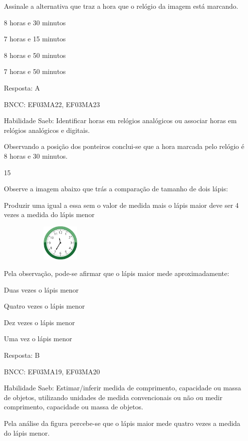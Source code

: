 \begin{escolha}
{\begin{escolha}
{Assinale a alternativa que traz a hora que o relógio da imagem está
marcando.

\begin{escolha}
\item
  8 horas e 30 minutos
\item
  7 horas e 15 minutos
\item
  8 horas e 50 minutos
\item
  7 horas e 50 minutos
\end{escolha}

Resposta: A

BNCC: EF03MA22, EF03MA23

Habilidade Saeb: Identificar horas em relógios analógicos ou associar
horas em relógios analógicos e digitais.

Observando a posição dos ponteiros conclui-se que a hora marcada pelo
relógio é 8 horas e 30 minutos.

\num{15}

Observe a imagem abaixo que trás a comparação de tamanho de dois lápis:

Produzir uma igual a essa sem o valor de medida mais o lápis maior deve
ser 4 vezes a medida do lápis menor

\includegraphics[width=2.43137in,height=0.71356in]{media/image116.png}

Pela observação, pode-se afirmar que o lápis maior mede aproximadamente:

\begin{escolha}
\item
  Duas vezes o lápis menor
\item
  Quatro vezes o lápis menor
\item
  Dez vezes o lápis menor
\item
  Uma vez o lápis menor
\end{escolha}

Resposta: B

BNCC: EF03MA19, EF03MA20

Habilidade Saeb: Estimar/inferir medida de comprimento, capacidade ou
massa de objetos, utilizando unidades de medida convencionais ou não ou
medir comprimento, capacidade ou massa de objetos.

Pela análise da figura percebe-se que o lápis maior mede quatro vezes a
medida do lápis menor.

}
\end{escolha}}
\end{escolha}
